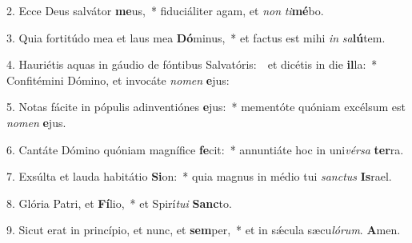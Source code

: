 
2. Ecce Deus salvátor \textbf{me}us,~* fiduciáliter agam, et \textit{non} \textit{ti}\textbf{mé}bo.

3. Quia fortitúdo mea et laus mea \textbf{Dó}minus,~* et factus est mihi \textit{in} \textit{sa}\textbf{lú}tem.

4. Hauriétis aquas in gáudio de fóntibus Salvatóris:~\GreDagger\ et dicétis in die \textbf{il}la:~* Confitémini Dómino, et invocáte \textit{no}\textit{men} \textbf{e}jus:

5. Notas fácite in pópulis adinventiónes \textbf{e}jus:~* mementóte quóniam excélsum est \textit{no}\textit{men} \textbf{e}jus.

6. Cantáte Dómino quóniam magnífice \textbf{fe}cit:~* annuntiáte hoc in uni\textit{vér}\textit{sa} \textbf{ter}ra.

7. Exsúlta et lauda habitátio \textbf{Si}on:~* quia magnus in médio tui \textit{sanc}\textit{tus} \textbf{Is}rael.

8. Glória Patri, et \textbf{Fí}lio,~* et Spirí\textit{tu}\textit{i} \textbf{Sanc}to.

9. Sicut erat in princípio, et nunc, et \textbf{sem}per,~* et in s\'{\ae}cula sæcu\textit{ló}\textit{rum}. \textbf{A}men.